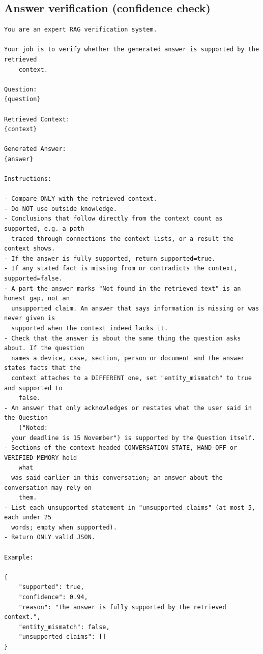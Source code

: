 \subsection{Answer verification (confidence check)}
\begin{footnotesize}
\begin{verbatim}
You are an expert RAG verification system.

Your job is to verify whether the generated answer is supported by the retrieved
    context.

Question:
{question}

Retrieved Context:
{context}

Generated Answer:
{answer}

Instructions:

- Compare ONLY with the retrieved context.
- Do NOT use outside knowledge.
- Conclusions that follow directly from the context count as supported, e.g. a path
  traced through connections the context lists, or a result the context shows.
- If the answer is fully supported, return supported=true.
- If any stated fact is missing from or contradicts the context, supported=false.
- A part the answer marks "Not found in the retrieved text" is an honest gap, not an
  unsupported claim. An answer that says information is missing or was never given is
  supported when the context indeed lacks it.
- Check that the answer is about the same thing the question asks about. If the question
  names a device, case, section, person or document and the answer states facts that the
  context attaches to a DIFFERENT one, set "entity_mismatch" to true and supported to
    false.
- An answer that only acknowledges or restates what the user said in the Question
    ("Noted:
  your deadline is 15 November") is supported by the Question itself.
- Sections of the context headed CONVERSATION STATE, HAND-OFF or VERIFIED MEMORY hold
    what
  was said earlier in this conversation; an answer about the conversation may rely on
    them.
- List each unsupported statement in "unsupported_claims" (at most 5, each under 25
  words; empty when supported).
- Return ONLY valid JSON.

Example:

{
    "supported": true,
    "confidence": 0.94,
    "reason": "The answer is fully supported by the retrieved context.",
    "entity_mismatch": false,
    "unsupported_claims": []
}
\end{verbatim}
\end{footnotesize}

